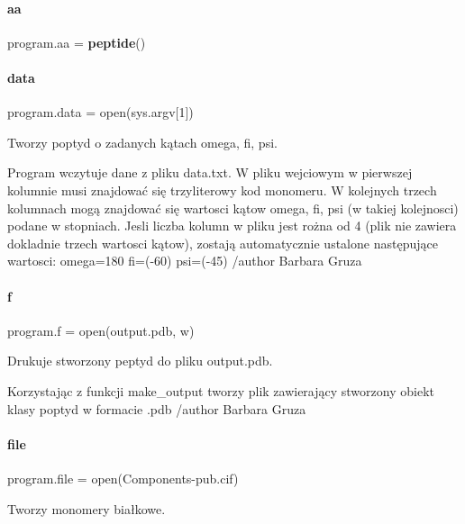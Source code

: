 \paragraph{aa}
{\footnotesize\ttfamily program.\+aa = \textbf{ peptide}()}

\mbox{\label{namespaceprogram_a044b3e27d1a91ad8a3a66ac4f32668f1}} 
\paragraph{data}
{\footnotesize\ttfamily program.\+data = open(sys.\+argv[1])}



Tworzy poptyd o zadanych kątach omega, fi, psi. 

Program wczytuje dane z pliku data.\+txt. W pliku wejciowym w pierwszej kolumnie musi znajdować się trzyliterowy kod monomeru. W kolejnych trzech kolumnach mogą znajdować się wartosci kątow omega, fi, psi (w takiej kolejnosci) podane w stopniach. Jesli liczba kolumn w pliku jest rożna od 4 (plik nie zawiera dokladnie trzech wartosci kątow), zostają automatycznie ustalone następujące wartosci\+: omega=180 fi=(-\/60) psi=(-\/45) /author Barbara Gruza \mbox{\label{namespaceprogram_af3cf1336dd6b364a2186dd146e846a4a}} 
\paragraph{f}
{\footnotesize\ttfamily program.\+f = open(\textquotesingle{}output.\+pdb\textquotesingle{}, \textquotesingle{}w\textquotesingle{})}



Drukuje stworzony peptyd do pliku output.\+pdb. 

Korzystając z funkcji make\+\_\+output tworzy plik zawierający stworzony obiekt klasy poptyd w formacie .pdb /author Barbara Gruza \mbox{\label{namespaceprogram_a8e2fe534c74d569fa181e0f2a6ff6440}} 
\paragraph{file}
{\footnotesize\ttfamily program.\+file = open(\textquotesingle{}Components-\/pub.\+cif\textquotesingle{})}



Tworzy monomery białkowe. 

